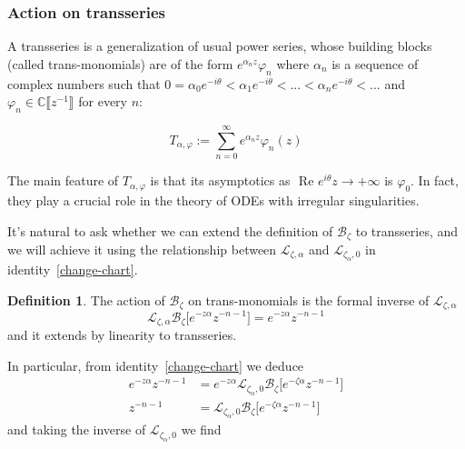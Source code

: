 \documentclass{article}
\newcommand{\C}{\mathbb{C}}
\newcommand{\laplace}{\mathcal{L}}
\newcommand{\borel}{\mathcal{B}}
\theoremstyle{definition}
\newtheorem{definition}{Definition}[section]
\theoremstyle{plain}
\begin{document}
\subsubsection{Action on transseries}\label{sec:action_transseries}

A transseries is a generalization of usual power series, whose building blocks (called trans-monomials) are of the form $e^{\alpha_n z}\varphi_n$ where $\alpha_n$ is a sequence of complex numbers such that $0=\alpha_0 e^{-i\theta}< \alpha_1 e^{-i\theta}<...<\alpha_n e^{-i\theta}<...$ and $\varphi_n\in\C\llbracket z^{-1}\rrbracket$ for every $n$: 

\[T_{\alpha,\varphi}:=\sum_{n=0}^{\infty} e^{\alpha_n z} \varphi_n(z) \]

The main feature of $T_{\alpha,\varphi}$ is that its asymptotics as $\text{ Re } e^{i\theta}z \to +\infty$ is $\varphi_0$. In fact, they play a crucial role in the theory of ODEs with irregular singularities. 

It's natural to ask whether we can extend the definition of $\borel_\zeta$ to transseries, and we will achieve it using the relationship between $\laplace_{\zeta, \alpha}$ and $\laplace_{\zeta_\alpha, 0}$ in identity~\eqref{change-chart}. 
\begin{definition}
    The action of $\borel_\zeta$ on trans-monomials is the formal inverse of $\laplace_{\zeta,\alpha}$
    \[\laplace_{\zeta,\alpha}\borel_\zeta\big[e^{-z\alpha}z^{-n-1}\big]=e^{-z\alpha}z^{-n-1}\]
    and it extends by linearity to transseries. 
\end{definition}
In particular, from identity~\eqref{change-chart} we deduce 
\begin{align*}
    e^{-z\alpha}z^{-n-1}&=e^{-z\alpha}\laplace_{\zeta_\alpha,0}\borel_\zeta\big[e^{-\zeta\alpha}z^{-n-1}\big]\\
     z^{-n-1}&=\laplace_{\zeta_\alpha,0}\borel_\zeta\big[e^{-\zeta\alpha}z^{-n-1}\big]
\end{align*}
and taking the inverse of $\laplace_{\zeta_\alpha,0}$ we find
\end{document}
